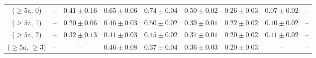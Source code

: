 \begin{table}[h!]
{\begin{tabular}{ccccccccc}
	($\ge5$a, 0) & -- & $0.41\pm 0.16$ & $0.65\pm 0.06$ & $0.74\pm 0.04$ & $0.50\pm 0.02$ & $0.26\pm 0.03$ & $0.07\pm 0.02$ & -- \\[0.5ex] 
	($\ge5$a, 1) & -- & $0.20\pm 0.06$ & $0.46\pm 0.03$ & $0.50\pm 0.02$ & $0.39\pm 0.01$ & $0.22\pm 0.02$ & $0.10\pm 0.02$ & -- \\[0.5ex] 
	($\ge5$a, 2) & -- & $0.32\pm 0.13$ & $0.41\pm 0.03$ & $0.45\pm 0.02$ & $0.37\pm 0.01$ & $0.20\pm 0.02$ & $0.11\pm 0.02$ & -- \\[0.5ex] 
	($\ge5$a, $\ge3$) & -- & -- & $0.46\pm 0.08$ & $0.37\pm 0.04$ & $0.36\pm 0.03$ & $0.20\pm 0.03$ & -- & -- \\[0.5ex] 
	\hline
	\hline
\end{tabular}}
\end{table}
